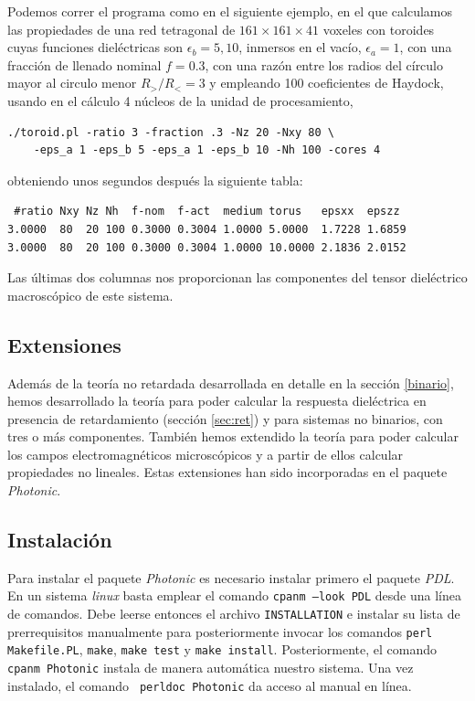 \documentclass[12pt]{article}
\begin{document}
Podemos correr el programa como en el siguiente ejemplo, en el que
calculamos las propiedades de una red tetragonal de
$161\times161\times41$ voxeles con toroides cuyas funciones
dieléctricas son $\epsilon_b=5,10$, inmersos en el vacío, $\epsilon_a=1$,
con una fracción de llenado nominal $f=0.3$, con una razón entre los
radios del círculo mayor al circulo menor $R_>/R_<=3$ y empleando 100
coeficientes de Haydock, usando en el cálculo 4 núcleos de la unidad
de procesamiento,
\begin{verbatim}
./toroid.pl -ratio 3 -fraction .3 -Nz 20 -Nxy 80 \
    -eps_a 1 -eps_b 5 -eps_a 1 -eps_b 10 -Nh 100 -cores 4
\end{verbatim}
obteniendo unos segundos después la siguiente tabla:
\begin{verbatim}
 #ratio Nxy Nz Nh  f-nom  f-act  medium torus   epsxx  epszz
3.0000  80  20 100 0.3000 0.3004 1.0000 5.0000  1.7228 1.6859
3.0000  80  20 100 0.3000 0.3004 1.0000 10.0000 2.1836 2.0152
\end{verbatim}
Las últimas dos columnas nos proporcionan las componentes del tensor
dieléctrico macroscópico de este sistema.

\subsection{Extensiones}
Además de la teoría no retardada desarrollada en detalle en la sección
\ref{binario}, hemos desarrollado la teoría para poder calcular la
respuesta dieléctrica en presencia de retardamiento (sección
\ref{sec:ret}) y para sistemas no
binarios, con tres o más componentes. También hemos extendido la
teoría para poder calcular los campos electromagnéticos microscópicos
y a partir de ellos calcular propiedades no lineales. Estas
extensiones han sido incorporadas en el paquete {\em Photonic}.

\subsection{Instalación}

Para instalar el paquete {\em Photonic} es necesario instalar primero
el paquete {\em PDL}. En un sistema {\em linux} basta emplear el
comando {\tt cpanm --look PDL} desde una línea de comandos. Debe
leerse entonces el archivo {\tt INSTALLATION} e instalar su lista de
prerrequisitos manualmente para posteriormente invocar los comandos
{\tt perl Makefile.PL}, {\tt make}, {\tt make test} y {\tt make
  install}. Posteriormente, el comando {\tt cpanm Photonic} instala de
manera automática nuestro sistema. Una vez instalado, el comando {\tt
  perldoc Photonic} da acceso al manual en línea.
\end{document}
